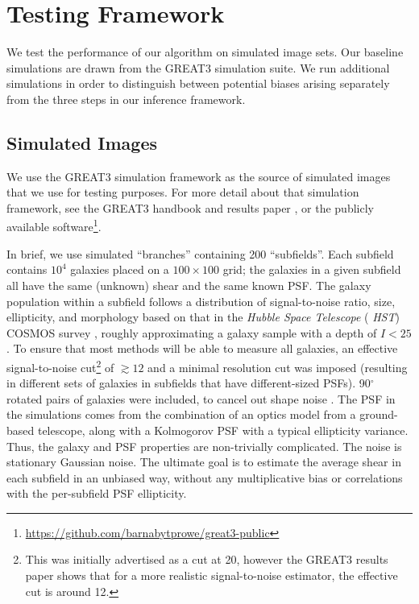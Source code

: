 \documentclass[iop]{emulateapj}
\begin{document}
\section{Testing Framework}
We test the performance of our algorithm on simulated image sets. Our
baseline simulations are drawn from the GREAT3 simulation suite. We
run additional simulations in order to distinguish between potential
biases arising separately from the three steps in our inference
framework.


\subsection{Simulated Images}

We use the GREAT3 simulation framework as the source of simulated
images that we use for testing purposes.  For more detail about that
simulation framework, see the GREAT3 handbook
\citep{2014ApJS..212....5M} and results paper
\citep{2015MNRAS.450.2963M}, or the publicly available
software\footnote{\url{https://github.com/barnabytprowe/great3-public}}.

In brief, we use simulated ``branches'' containing 200 ``subfields''.
Each subfield contains $10^4$ galaxies placed on a $100\times 100$
grid; the galaxies in a given subfield all have the same (unknown)
shear and the same known PSF.  The galaxy population within a subfield
follows a distribution of signal-to-noise ratio, size, ellipticity,
and morphology based on that in the {\it Hubble Space Telescope} ({\it
  HST}) COSMOS survey
\citep{2007ApJS..172..196K,2007ApJS..172....1S,2007ApJS..172...38S},
roughly approximating a galaxy sample with a depth of $I<25$.  To
ensure that most methods will be able to measure all galaxies, an
effective signal-to-noise cut\footnote{This was initially advertised as a cut at 20, however the
  GREAT3 results paper shows that for a more realistic signal-to-noise estimator, the effective cut
  is around 12.} of $\gtrsim 12$ and a minimal resolution
cut was imposed (resulting in different sets of galaxies in subfields
that have different-sized PSFs).  90$^\circ$ rotated pairs of galaxies
were included, to cancel out shape noise \citep{2007MNRAS.376...13M}.
The PSF in the simulations comes from the combination of an optics
model from a ground-based telescope, along with a Kolmogorov PSF with
a typical ellipticity variance.  Thus, the galaxy and PSF properties
are non-trivially complicated.  The noise is stationary Gaussian
noise.  The ultimate goal is to estimate the average shear in each
subfield in an unbiased way, without any multiplicative bias or
correlations with the per-subfield PSF ellipticity.
\end{document}
